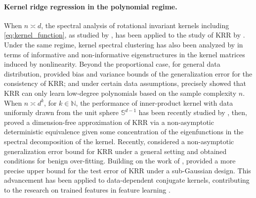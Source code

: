 \documentclass[twoside,11pt]{article}
\newcommand{\N}{\mathbb{N}}
\newcommand{\1}{\mathbf{1}}
\begin{document}
\paragraph{Kernel ridge regression in the polynomial regime.}
 When $n\asymp d$, the spectral analysis of rotational invariant kernels including \eqref{eq:kernel_function}, as studied by \cite{el2010spectrum}, has been applied to the study of KRR by \cite{liang2020just,elkhalil2020risk,liu2021kernel,bartlett2021deep,sahraee2022kernel}. Under the same regime, kernel spectral clustering has also been analyzed by \cite{couillet2016kernel,liao2019inner,seddik2019kernel,seddik2019kernelb,liao2021sparse,li2025eigen} in terms of informative and non-informative eigenstructures in the kernel matrices induced by nonlinearity. Beyond the proportional case, for general data distribution, \cite{liang2020multiple,donhauser2021rotational,aerni2023strong,lu2023optimal} provided bias and variance bounds of the generalization error for the consistency of KRR; and under certain data assumptions, \cite{ghorbani2020neural,ghorbani2021linearized,mei2021generalization} precisely showed that KRR can only learn low-degree polynomials based on the sample complexity $n$. When $n\asymp d^k$, for $k\in\N$, the performance of inner-product kernel with data uniformly drawn from the unit sphere $\mathbb{S}^{d-1}$ has been recently studied by \cite{xiao2022precise}, then, \cite{misiakiewicz2024non} proved a dimension-free approximation of KRR via a non-asymptotic deterministic equivalence given some concentration of the eigenfunctions in the spectral decomposition of the kernel. Recently, \cite{barzilai2023generalization,cheng2024characterizing} considered a non-asymptotic generalization error bound for KRR under a general setting and obtained conditions for benign over-fitting. Building on the work of \cite{liang2020multiple,ghorbani2021linearized}, \cite{gavrilopoulos2024geometrical} provided a more precise upper bound for the test error of KRR under a sub-Gaussian design. This advancement has been applied to data-dependent conjugate kernels, contributing to the research on trained features in feature learning \citep{ba2022high,gavrilopoulos2024geometrical}.
\end{document}
